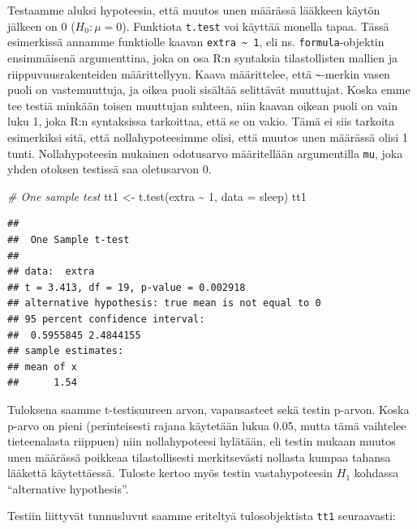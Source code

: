 \documentclass[
]{book}
\newenvironment{Shaded}{\begin{snugshade}}{\end{snugshade}}
\newcommand{\AttributeTok}[1]{\textcolor[rgb]{0.77,0.63,0.00}{#1}}
\newcommand{\CommentTok}[1]{\textcolor[rgb]{0.56,0.35,0.01}{\textit{#1}}}
\newcommand{\DecValTok}[1]{\textcolor[rgb]{0.00,0.00,0.81}{#1}}
\newcommand{\FunctionTok}[1]{\textcolor[rgb]{0.00,0.00,0.00}{#1}}
\newcommand{\NormalTok}[1]{#1}
\newcommand{\OtherTok}[1]{\textcolor[rgb]{0.56,0.35,0.01}{#1}}
\newcommand{\SpecialCharTok}[1]{\textcolor[rgb]{0.00,0.00,0.00}{#1}}
\begin{document}
Testaamme aluksi hypoteesia, että muutos unen määrässä lääkkeen käytön jälkeen on 0 (\(H_0 : \mu = 0\)). Funktiota \texttt{t.test} voi käyttää monella tapaa. Tässä esimerkissä annamme funktiolle kaavan \texttt{extra\ \textasciitilde{}\ 1}, eli ns. \texttt{formula}-objektin ensimmäisenä argumenttina, joka on osa R:n syntaksia tilastollisten mallien ja riippuvuusrakenteiden määrittellyyn. Kaava määrittelee, että \texttt{\textasciitilde{}}-merkin vasen puoli on vastemuuttuja, ja oikea puoli sisältää selittävät muuttujat. Koska emme tee testiä minkään toisen muuttujan suhteen, niin kaavan oikean puoli on vain luku 1, joka R:n syntaksissa tarkoittaa, että se on vakio. Tämä ei siis tarkoita esimerkiksi sitä, että nollahypoteesimme olisi, että muutos unen määrässä olisi 1 tunti. Nollahypoteesin mukainen odotusarvo määritellään argumentilla \texttt{mu}, joka yhden otoksen testissä saa oletusarvon 0.

\begin{Shaded}
\begin{Highlighting}[]
\CommentTok{\# One sample test}
\NormalTok{tt1 }\OtherTok{\textless{}{-}} \FunctionTok{t.test}\NormalTok{(extra }\SpecialCharTok{\textasciitilde{}} \DecValTok{1}\NormalTok{, }\AttributeTok{data =}\NormalTok{ sleep)}
\NormalTok{tt1}
\end{Highlighting}
\end{Shaded}

\begin{verbatim}
## 
##  One Sample t-test
## 
## data:  extra
## t = 3.413, df = 19, p-value = 0.002918
## alternative hypothesis: true mean is not equal to 0
## 95 percent confidence interval:
##  0.5955845 2.4844155
## sample estimates:
## mean of x 
##      1.54
\end{verbatim}

Tuloksena saamme t-testisuureen arvon, vapausasteet sekä testin p-arvon. Koska p-arvo on pieni (perinteisesti rajana käytetään lukua 0.05, mutta tämä vaihtelee tieteenalasta riippuen) niin nollahypoteesi hylätään, eli testin mukaan muutos unen määrässä poikkeaa tilastollisesti merkitsevästi nollasta kumpaa tahansa lääkettä käytettäessä. Tuloste kertoo myös testin vastahypoteesin \(H_1\) kohdassa ``alternative hypothesis''.

Testiin liittyvät tunnusluvut saamme eriteltyä tulosobjektista \texttt{tt1} seuraavasti:

\begin{Shaded}
\end{Shaded}
\end{document}
